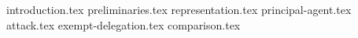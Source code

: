 {introduction.tex}
{preliminaries.tex}
{representation.tex}
{principal-agent.tex}
{attack.tex}
{exempt-delegation.tex}
{comparison.tex}
